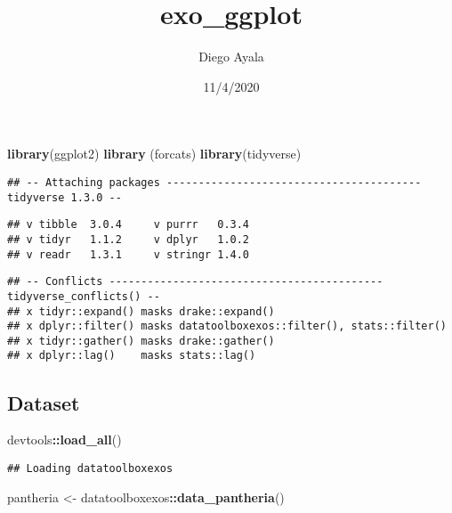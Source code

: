 \documentclass[
]{article}
\title{exo\_ggplot}
\author{Diego Ayala}
\date{11/4/2020}
\newenvironment{Shaded}{\begin{snugshade}}{\end{snugshade}}
\newcommand{\KeywordTok}[1]{\textcolor[rgb]{0.13,0.29,0.53}{\textbf{#1}}}
\newcommand{\NormalTok}[1]{#1}
\newcommand{\OperatorTok}[1]{\textcolor[rgb]{0.81,0.36,0.00}{\textbf{#1}}}
\newcommand{\StringTok}[1]{\textcolor[rgb]{0.31,0.60,0.02}{#1}}
\begin{document}
\maketitle

\begin{Shaded}
\begin{Highlighting}[]
\KeywordTok{library}\NormalTok{(ggplot2)}
\KeywordTok{library}\NormalTok{ (forcats)}
\KeywordTok{library}\NormalTok{(tidyverse)}
\end{Highlighting}
\end{Shaded}

\begin{verbatim}
## -- Attaching packages ---------------------------------------- tidyverse 1.3.0 --
\end{verbatim}

\begin{verbatim}
## v tibble  3.0.4     v purrr   0.3.4
## v tidyr   1.1.2     v dplyr   1.0.2
## v readr   1.3.1     v stringr 1.4.0
\end{verbatim}

\begin{verbatim}
## -- Conflicts ------------------------------------------- tidyverse_conflicts() --
## x tidyr::expand() masks drake::expand()
## x dplyr::filter() masks datatoolboxexos::filter(), stats::filter()
## x tidyr::gather() masks drake::gather()
## x dplyr::lag()    masks stats::lag()
\end{verbatim}

\hypertarget{dataset}{%
\subsection{Dataset}\label{dataset}}

\begin{Shaded}
\begin{Highlighting}[]
\NormalTok{devtools}\OperatorTok{::}\KeywordTok{load_all}\NormalTok{()}
\end{Highlighting}
\end{Shaded}

\begin{verbatim}
## Loading datatoolboxexos
\end{verbatim}

\begin{Shaded}
\begin{Highlighting}[]
\NormalTok{pantheria  <-}\StringTok{ }\NormalTok{datatoolboxexos}\OperatorTok{::}\KeywordTok{data_pantheria}\NormalTok{()}
\end{Highlighting}
\end{Shaded}
\end{document}
